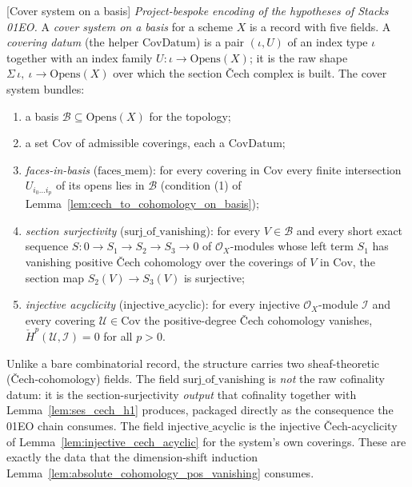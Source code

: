 \begin{definition}

[Cover system on a basis]
  \label{def:basis_cov_system}
  \textit{Project-bespoke encoding of the hypotheses of Stacks 01EO.}
  A \emph{cover system on a basis} for a scheme \(X\) is a record with five fields. A
  \emph{covering datum} (the helper \(\mathrm{CovDatum}\)) is a pair \((\iota, U)\) of an index type
  \(\iota\) together with an index family \(U : \iota \to \mathrm{Opens}(X)\); it is the raw shape
  \(\Sigma\,\iota,\ \iota \to \mathrm{Opens}(X)\) over which the section {\v C}ech complex is built.
  The cover system bundles:
  \begin{enumerate}
  \item a basis \(\mathcal{B} \subseteq \mathrm{Opens}(X)\) for the topology;
  \item a set \(\mathrm{Cov}\) of admissible coverings, each a \(\mathrm{CovDatum}\);
  \item \emph{faces-in-basis} (\(\mathrm{faces\_mem}\)): for every covering in \(\mathrm{Cov}\) every
    finite intersection \(U_{i_0 \ldots i_p}\) of its opens lies in \(\mathcal{B}\) (condition (1) of
    Lemma~\ref{lem:cech_to_cohomology_on_basis});
  \item \emph{section surjectivity} (\(\mathrm{surj\_of\_vanishing}\)): for every \(V \in \mathcal{B}\)
    and every short exact sequence \(S : 0 \to S_1 \to S_2 \to S_3 \to 0\) of \(\mathcal{O}_X\)-modules
    whose left term \(S_1\) has vanishing positive {\v C}ech cohomology over the coverings of \(V\) in
    \(\mathrm{Cov}\), the section map \(S_2(V) \to S_3(V)\) is surjective;
  \item \emph{injective acyclicity} (\(\mathrm{injective\_acyclic}\)): for every injective
    \(\mathcal{O}_X\)-module \(\mathcal{I}\) and every covering \(\mathcal{U} \in \mathrm{Cov}\) the
    positive-degree {\v C}ech cohomology vanishes, \(\check{H}^p(\mathcal{U}, \mathcal{I}) = 0\) for
    all \(p > 0\).
  \end{enumerate}
  Unlike a bare combinatorial record, the structure carries two sheaf-theoretic ({\v C}ech-cohomology)
  fields. The field \(\mathrm{surj\_of\_vanishing}\) is \emph{not} the raw cofinality datum: it is the
  section-surjectivity \emph{output} that cofinality together with Lemma~\ref{lem:ses_cech_h1}
  produces, packaged directly as the consequence the 01EO chain consumes. The field
  \(\mathrm{injective\_acyclic}\) is the injective {\v C}ech-acyclicity of
  Lemma~\ref{lem:injective_cech_acyclic} for the system's own coverings. These are exactly the data
  that the dimension-shift induction Lemma~\ref{lem:absolute_cohomology_pos_vanishing} consumes.
\end{definition}

